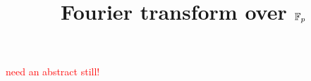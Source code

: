 \documentclass[10pt,a4paper]{amsart}
\begin{document}
	
	\title{Fourier transform over $\mathbb{F}_p$}
	
	\maketitle
	
	\textcolor{red}{need an abstract still!}
	
	\tableofcontents

    
    
	
	
    
	\clearpage
	\appendix
	

    
	
\end{document}
